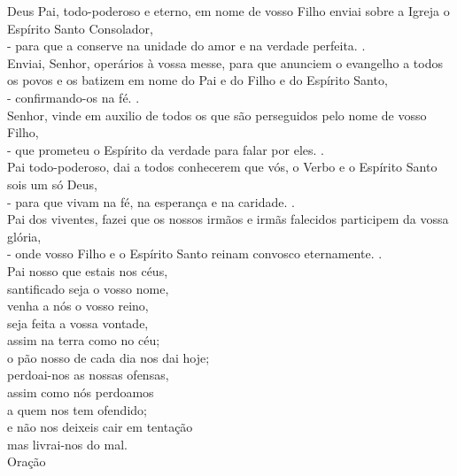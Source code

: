 \documentclass{book}
\begin{document}
\begin{center}
    Deus Pai, todo-poderoso e eterno, em nome de vosso Filho enviai sobre a Igreja o Espírito Santo Consolador, \\
    - para que a conserve na unidade do amor e na verdade perfeita. {\color{VioletRed2} \Rbar.}
    \vspace{.2cm} \\
    Enviai, Senhor, operários à vossa messe, para que anunciem o evangelho a todos os povos e os batizem em nome do Pai e do Filho e do Espírito Santo, \\
    - confirmando-os na fé. {\color{VioletRed2} \Rbar.}
    \vspace{.2cm} \\
    Senhor, vinde em auxilio de todos os que são perseguidos pelo nome de vosso Filho, \\
    - que prometeu o Espírito da verdade para falar por eles. {\color{VioletRed2} \Rbar.}
    \vspace{.2cm} \\
    Pai todo-poderoso, dai a todos conhecerem que vós, o Verbo e o Espírito Santo sois um só Deus, \\
    - para que vivam na fé, na esperança e na caridade. {\color{VioletRed2} \Rbar.}
    \vspace{.2cm} \\
    Pai dos viventes, fazei que os nossos irmãos e irmãs falecidos participem da vossa glória, \\
    - onde vosso Filho e o Espírito Santo reinam convosco eternamente. {\color{VioletRed2} \Rbar.}
    \vspace{.2cm} \\
    Pai nosso que estais nos céus, \\
    santificado seja o vosso nome, \\
    venha a nós o vosso reino, \\
    seja feita a vossa vontade, \\
    assim na terra como no céu; \\
    o pão nosso de cada dia nos dai hoje; \\
    perdoai-nos as nossas ofensas, \\
    assim como nós perdoamos \\
    a quem nos tem ofendido; \\
    e não nos deixeis cair em tentação \\
    mas livrai-nos do mal.
    \vspace{.2cm} \\
    \textcolor{VioletRed2}{Oração}

\end{center}
\end{document}
